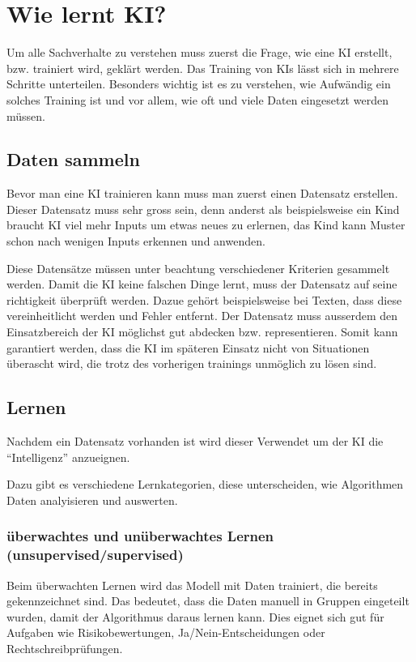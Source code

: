 \chapter{Wie lernt KI?}
\label{chap:ai-training}

Um alle Sachverhalte zu verstehen muss zuerst die Frage, wie eine KI erstellt, bzw. trainiert wird, geklärt werden.
Das Training von KIs lässt sich in mehrere Schritte unterteilen.
Besonders wichtig ist es zu verstehen, wie Aufwändig ein solches Training ist und vor allem, wie oft und viele Daten eingesetzt werden müssen.

\section{Daten sammeln}
Bevor man eine KI trainieren kann muss man zuerst einen Datensatz erstellen. Dieser Datensatz muss sehr gross sein, denn anderst als beispielsweise ein Kind braucht KI viel mehr Inputs um etwas neues zu erlernen, das Kind kann Muster schon nach wenigen Inputs erkennen und anwenden.

Diese Datensätze müssen unter beachtung verschiedener Kriterien gesammelt werden. 
Damit die KI keine falschen Dinge lernt, muss der Datensatz auf seine richtigkeit überprüft werden. Dazue gehört beispielsweise bei Texten, dass diese vereinheitlicht werden und Fehler entfernt.
Der Datensatz muss ausserdem den Einsatzbereich der KI möglichst gut abdecken bzw. representieren. Somit kann garantiert werden, dass die KI im späteren Einsatz nicht von Situationen überascht wird, die trotz des vorherigen trainings unmöglich zu lösen sind.

\section{Lernen}
Nachdem ein Datensatz vorhanden ist wird dieser Verwendet um der KI die \enquote{Intelligenz} anzueignen. 

Dazu gibt es verschiedene Lernkategorien, diese unterscheiden, wie Algorithmen Daten analyisieren und auswerten.
\subsection{überwachtes und unüberwachtes Lernen (unsupervised/supervised)}
Beim überwachten Lernen wird das Modell mit Daten trainiert, die bereits gekennzeichnet sind. Das bedeutet, dass die Daten manuell in Gruppen eingeteilt wurden, damit der Algorithmus daraus lernen kann. 
Dies eignet sich gut für Aufgaben wie Risikobewertungen, Ja/Nein-Entscheidungen oder Rechtschreibprüfungen.

